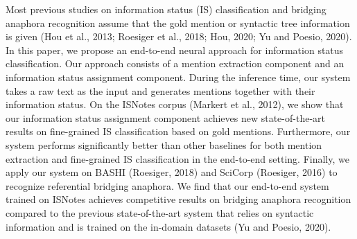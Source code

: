 Most previous studies on information status (IS) classification and bridging anaphora recognition assume that the gold mention or syntactic tree information is given (Hou et al., 2013; Roesiger et al., 2018; Hou, 2020; Yu and Poesio, 2020). In this paper, we propose an end-to-end neural approach for information status classification. Our approach consists of a mention extraction component and an information status assignment component. During the inference time, our system takes a raw text as the input and generates mentions together with their information status. On the ISNotes corpus (Markert et al., 2012), we show that our information status assignment component achieves new state-of-the-art results on fine-grained IS classification based on gold mentions. Furthermore, our system performs significantly better than other baselines for both mention extraction and fine-grained IS classification in the end-to-end setting. Finally, we apply our system on BASHI (Roesiger, 2018) and SciCorp (Roesiger, 2016) to recognize referential bridging anaphora. We find that our end-to-end system trained on ISNotes achieves competitive results on bridging anaphora recognition compared to the previous state-of-the-art system that relies on syntactic information and is trained on the in-domain datasets (Yu and Poesio, 2020).
